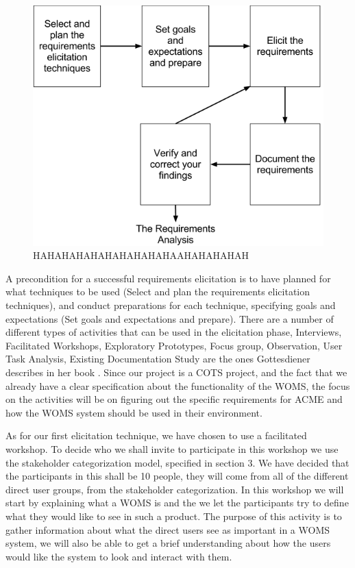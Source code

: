 \documentclass[a4paper]{article}
\begin{document}
\begin{figure}[!ht]
	\includegraphics[width=1\textwidth]{images/elicitation_model.png}
	\caption{HAHAHAHAHAHAHAHAHAHAAHAHAHAHAH}
	\label{figure:elicitation}
\end{figure}


A precondition for a successful requirements elicitation is to have planned for what techniques to be used (Select and plan the requirements elicitation techniques), and conduct preparations for each technique, specifying goals and expectations (Set goals and expectations and prepare). There are a number of different types of activities that can be used in the elicitation phase, Interviews, Facilitated Workshops, Exploratory Prototypes, Focus group, Observation, User Task Analysis, Existing Documentation Study are the ones Gottesdiener describes in her book \cite{gott64}. Since our project is a COTS project, and the fact that we already have a clear specification about the functionality of the WOMS, the focus on the activities will be on figuring out the specific requirements for ACME and how the WOMS system should be used in their environment.

As for our first elicitation technique, we have chosen to use a facilitated workshop. To decide who we shall invite to participate in this workshop we use the stakeholder categorization model, specified in section 3. We have decided that the participants in this shall be 10 people, they will come from all of the different direct user groups, from the stakeholder categorization. In this workshop we will start by explaining what a WOMS is and the we let the participants try to define what they would like to see in such a product. The purpose of this activity is to gather information about what the direct users see as important in a WOMS system, we will also be able to get a brief understanding about how the users would like the system to look and interact with them.
\end{document}
